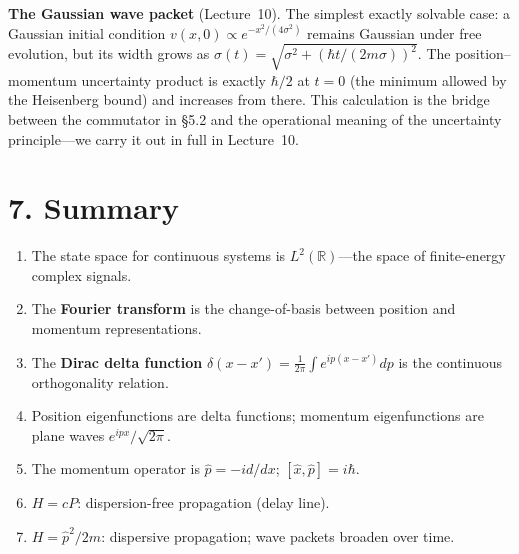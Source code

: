 \documentclass[12pt,a4paper]{article}
\begin{document}
\medskip
\noindent\textbf{The Gaussian wave packet} (Lecture~10).  The simplest exactly solvable case: a Gaussian initial condition $v(x,0) \propto e^{-x^2/(4\sigma^2)}$ remains Gaussian under free evolution, but its width grows as $\sigma(t) = \sqrt{\sigma^2 + (\hbar t/(2m\sigma))^2}$.  The position--momentum uncertainty product is exactly $\hbar/2$ at $t=0$ (the minimum allowed by the Heisenberg bound) and increases from there.  This calculation is the bridge between the commutator in \S5.2 and the operational meaning of the uncertainty principle---we carry it out in full in Lecture~10.

\section{7. Summary}

\begin{enumerate}[nosep]
    \item The state space for continuous systems is $L^2(\mathbb{R})$---the space of finite-energy complex signals.
    \item The \textbf{Fourier transform} is the change-of-basis between position and momentum representations.
    \item The \textbf{Dirac delta function} $\delta(x-x')=\frac{1}{2\pi}\int e^{ip(x-x')}dp$ is the continuous orthogonality relation.
    \item Position eigenfunctions are delta functions; momentum eigenfunctions are plane waves $e^{ipx}/\sqrt{2\pi}$.
    \item The momentum operator is $\hat{p}=-id/dx$; $[\hat{x},\hat{p}]=i\hbar$.
    \item $H=cP$: dispersion-free propagation (delay line).
    \item $H=\hat{p}^2/2m$: dispersive propagation; wave packets broaden over time.
\end{enumerate}
\end{document}

